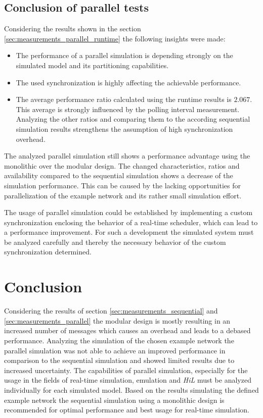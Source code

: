 \subsection{Conclusion of parallel tests}

Considering the results shown in the section \ref{sec:measurements_parallel_runtime} the following insights were made:

\begin{itemize}
    \item The performance of a parallel simulation is depending strongly on the simulated model and its partitioning capabilities.
    \item The used synchronization is highly affecting the achievable performance.
    \item The average performance ratio calculated using the runtime results is $2.067$.
    This average is strongly influenced by the polling interval measurement.
    Analyzing the other ratios and comparing them to the according sequential simulation results strengthens the assumption of high synchronization overhead.
\end{itemize}

The analyzed parallel simulation still shows a performance advantage using the monolithic over the modular design.
The changed characteristics, ratios and availability compared to the sequential simulation shows a decrease of the simulation performance.
This can be caused by the lacking opportunities for parallelization of the example network and its rather small simulation effort.

The usage of parallel simulation could be established by implementing a custom synchronization enclosing the behavior of a real-time scheduler, which can lead to a performance improvement.
For such a development the simulated system must be analyzed carefully and thereby the necessary behavior of the custom synchronization determined.

\section{Conclusion}
Considering the results of section \ref{sec:measurements_sequential} and \ref{sec:measurements_parallel} the modular design is mostly resulting in an increased number of messages which causes an overhead and leads to a debased performance.
Analyzing the simulation of the chosen example network the parallel simulation was not able to achieve an improved performance in comparison to the sequential simulation and showed limited results due to increased uncertainty.
The capabilities of parallel simulation, especially for the usage in the fields of real-time simulation, emulation and \emph{HiL} must be analyzed individually for each simulated model.
Based on the results simulating the defined example network the sequential simulation using a monolithic design is recommended for optimal performance and best usage for real-time simulation.

